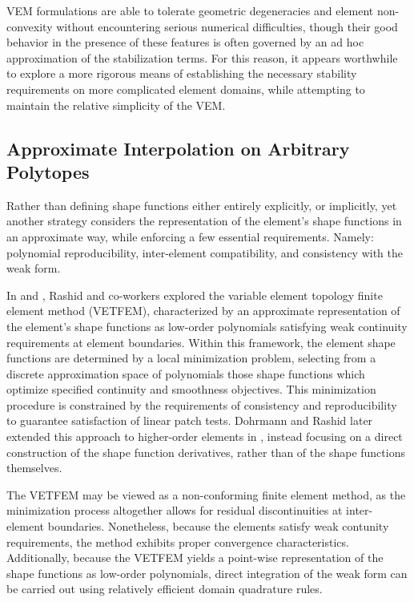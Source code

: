 		VEM formulations are able to tolerate geometric degeneracies and element non-convexity without encountering serious numerical difficulties, though their good behavior in the presence of these features is often governed by an ad hoc approximation of the stabilization terms. For this reason, it appears worthwhile to explore a more rigorous means of establishing the necessary stability requirements on more complicated element domains, while attempting to maintain the relative simplicity of the VEM.
		
	\subsection{Approximate Interpolation on Arbitrary Polytopes}
		Rather than defining shape functions either entirely explicitly, or implicitly, yet another strategy considers the representation of the element's shape functions in an approximate way, while enforcing a few essential requirements. Namely: polynomial reproducibility, inter-element compatibility, and consistency with the weak form.
		
		In \cite{Rashid:00} and \cite{Rashid:06}, Rashid and co-workers  explored the variable element topology finite element method (VETFEM), characterized by an approximate representation of the element's shape functions as low-order polynomials satisfying weak continuity requirements at element boundaries. Within this framework, the element shape functions are determined by a local minimization problem, selecting from a discrete approximation space of polynomials those shape functions which optimize specified continuity and smoothness objectives. This minimization procedure is constrained by the requirements of consistency and reproducibility to guarantee satisfaction of linear patch tests. Dohrmann and Rashid later extended this approach to higher-order elements in \cite{Dohrmann:02}, instead focusing on a direct construction of the shape function derivatives, rather than of the shape functions themselves.
		
		The VETFEM may be viewed as a non-conforming finite element method, as the minimization process altogether allows for residual discontinuities at inter-element boundaries. Nonetheless, because the elements satisfy weak contunity requirements, the method exhibits proper convergence characteristics. Additionally, because the VETFEM yields a point-wise representation of the shape functions as low-order polynomials, direct integration of the weak form can be carried out using relatively efficient domain quadrature rules.
			
